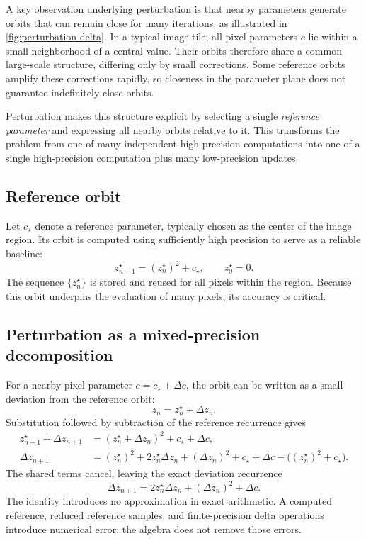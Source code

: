 A key observation underlying perturbation is that nearby parameters generate
orbits that can remain close for many iterations, as illustrated in
\cref{fig:perturbation-delta}. In a typical image tile, all pixel
parameters \(c\) lie within a small neighborhood of a central value. Their
orbits therefore share a common large-scale structure, differing only by small
corrections. Some reference orbits amplify these corrections rapidly, so
closeness in the parameter plane does not guarantee indefinitely close orbits.

Perturbation makes this structure explicit by selecting a single
\emph{reference parameter} and expressing all nearby orbits relative to it. This
transforms the problem from one of many independent high-precision computations
into one of a single high-precision computation plus many low-precision updates.

\subsection{Reference orbit}

Let \(c_\star\) denote a reference parameter, typically chosen as the center of
the image region. Its orbit is computed using sufficiently high precision to
serve as a reliable baseline:
\begin{equation}
z_{n+1}^\star = (z_n^\star)^2 + c_\star, \qquad z_0^\star = 0.
\label{eq:ref-orbit-recurrence}
\end{equation}
The sequence \(\{z_n^\star\}\) is stored and reused for all pixels within the
region. Because this orbit underpins the evaluation of many pixels, its
accuracy is critical.

\subsection{Perturbation as a mixed-precision decomposition}
\label{subsec:perturbation-mixed-precision}

For a nearby pixel parameter \(c = c_\star + \Delta c\), the orbit can be written
as a small deviation from the reference orbit:
\begin{equation}
z_n = z_n^\star + \Delta z_n.
\label{eq:perturb-decomposition}
\end{equation}
Substitution followed by subtraction of the reference recurrence gives
\begin{align*}
z_{n+1}^\star+\Delta z_{n+1}
  &= (z_n^\star+\Delta z_n)^2+c_\star+\Delta c,\\
\Delta z_{n+1}
  &= (z_n^\star)^2+2z_n^\star\Delta z_n+(\Delta z_n)^2+c_\star+\Delta c
     -\bigl((z_n^\star)^2+c_\star\bigr).
\end{align*}
The shared terms cancel, leaving the exact deviation recurrence
\begin{equation}
\Delta z_{n+1}
= 2 z_n^\star \Delta z_n + (\Delta z_n)^2 + \Delta c.
\label{eq:perturb-exact}
\end{equation}
The identity introduces no approximation in exact arithmetic. A computed
reference, reduced reference samples, and finite-precision delta operations
introduce numerical error; the algebra does not remove those errors.

